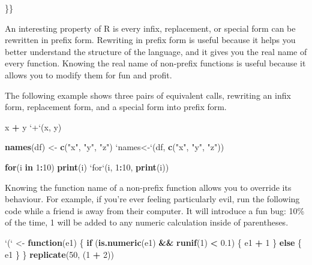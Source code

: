 \documentclass[]{book}
\newenvironment{Shaded}{\begin{snugshade}}{\end{snugshade}}
\newcommand{\ControlFlowTok}[1]{\textcolor[rgb]{0.13,0.29,0.53}{\textbf{#1}}}
\newcommand{\DataTypeTok}[1]{\textcolor[rgb]{0.13,0.29,0.53}{#1}}
\newcommand{\DecValTok}[1]{\textcolor[rgb]{0.00,0.00,0.81}{#1}}
\newcommand{\FloatTok}[1]{\textcolor[rgb]{0.00,0.00,0.81}{#1}}
\newcommand{\KeywordTok}[1]{\textcolor[rgb]{0.13,0.29,0.53}{\textbf{#1}}}
\newcommand{\NormalTok}[1]{#1}
\newcommand{\OperatorTok}[1]{\textcolor[rgb]{0.81,0.36,0.00}{\textbf{#1}}}
\newcommand{\StringTok}[1]{\textcolor[rgb]{0.31,0.60,0.02}{#1}}
\theoremstyle{definition}
\theoremstyle{definition}
\theoremstyle{definition}
\theoremstyle{remark}
\begin{document}
\}\}

An interesting property of R is every infix, replacement, or special
form can be rewritten in prefix form. Rewriting in prefix form is useful
because it helps you better understand the structure of the language,
and it gives you the real name of every function. Knowing the real name
of non-prefix functions is useful because it allows you to modify them
for fun and profit.

The following example shows three pairs of equivalent calls, rewriting
an infix form, replacement form, and a special form into prefix form.

\begin{Shaded}
\begin{Highlighting}[]
\NormalTok{x }\OperatorTok{+}\StringTok{ }\NormalTok{y}
\StringTok{`}\DataTypeTok{+}\StringTok{`}\NormalTok{(x, y)}

\KeywordTok{names}\NormalTok{(df) <-}\StringTok{ }\KeywordTok{c}\NormalTok{(}\StringTok{"x"}\NormalTok{, }\StringTok{"y"}\NormalTok{, }\StringTok{"z"}\NormalTok{)}
\StringTok{`}\DataTypeTok{names<-}\StringTok{`}\NormalTok{(df, }\KeywordTok{c}\NormalTok{(}\StringTok{"x"}\NormalTok{, }\StringTok{"y"}\NormalTok{, }\StringTok{"z"}\NormalTok{))}

\ControlFlowTok{for}\NormalTok{(i }\ControlFlowTok{in} \DecValTok{1}\OperatorTok{:}\DecValTok{10}\NormalTok{) }\KeywordTok{print}\NormalTok{(i)}
\StringTok{`}\DataTypeTok{for}\StringTok{`}\NormalTok{(i, }\DecValTok{1}\OperatorTok{:}\DecValTok{10}\NormalTok{, }\KeywordTok{print}\NormalTok{(i))}
\end{Highlighting}
\end{Shaded}

Knowing the function name of a non-prefix function allows you to
override its behaviour. For example, if you're ever feeling particularly
evil, run the following code while a friend is away from their computer.
It will introduce a fun bug: 10\% of the time, 1 will be added to any
numeric calculation inside of parentheses.

\begin{Shaded}
\begin{Highlighting}[]
\StringTok{`}\DataTypeTok{(}\StringTok{`}\NormalTok{ <-}\StringTok{ }\ControlFlowTok{function}\NormalTok{(e1) \{}
  \ControlFlowTok{if}\NormalTok{ (}\KeywordTok{is.numeric}\NormalTok{(e1) }\OperatorTok{&&}\StringTok{ }\KeywordTok{runif}\NormalTok{(}\DecValTok{1}\NormalTok{) }\OperatorTok{<}\StringTok{ }\FloatTok{0.1}\NormalTok{) \{}
\NormalTok{    e1 }\OperatorTok{+}\StringTok{ }\DecValTok{1}
\NormalTok{  \} }\ControlFlowTok{else}\NormalTok{ \{}
\NormalTok{    e1}
\NormalTok{  \}}
\NormalTok{\}}
\KeywordTok{replicate}\NormalTok{(}\DecValTok{50}\NormalTok{, (}\DecValTok{1} \OperatorTok{+}\StringTok{ }\DecValTok{2}\NormalTok{))}
\end{Highlighting}
\end{Shaded}
\end{document}
